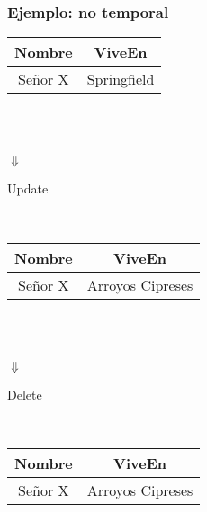 \documentclass[12pt]{beamer}
\begin{document}
\begin{frame}
\frametitle{Ejemplo: no temporal}
\begin{center}
\begin{tabular}{|c|c|}
\hline
Nombre & ViveEn\\
\hline
Se\~nor X & Springfield\\
\hline
\end{tabular}
\\
\ \\
\begin{Huge}{$\Downarrow$}\end{Huge}\begin{small}{Update}\end{small}\\
\begin{tabular}{|c|c|}
\hline
Nombre & ViveEn\\
\hline
Se\~nor X & Arroyos Cipreses\\
\hline
\end{tabular}
\\
\ \\
\begin{Huge}{$\Downarrow$}\end{Huge}\begin{small}{Delete}\end{small}\\
\begin{tabular}{|c|c|}
\hline
Nombre & ViveEn\\
\hline
\sout{Se\~nor X} & \sout{Arroyos Cipreses}\\
\hline
\end{tabular}
\end{center}
\end{frame}
\end{document}
